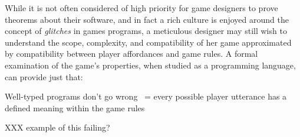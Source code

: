   While it is not often considered of high priority for game designers to
  prove theorems about their software, and in fact a rich culture is
  enjoyed around the concept of {\em glitches} in games programs, a
  meticulous designer may still wish to understand the scope, complexity,
  and compatibility of her game approximated by compatibility between 
  player affordances and game rules. A formal examination of the game's
  properties, when studied as a programming language, can provide just
  that:

  Well-typed programs don't go wrong ~= every possible player utterance has
  a defined meaning within the game rules

  XXX example of this failing?

